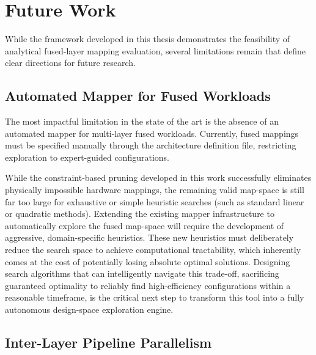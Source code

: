 \section{Future Work}
\label{sec:concl-future}

While the framework developed in this thesis demonstrates the feasibility of analytical fused-layer mapping evaluation, several limitations remain that define clear directions for future research.

\subsection{Automated Mapper for Fused Workloads}
\label{sec:fw-mapper}

The most impactful limitation in the state of the art is the absence of an automated mapper for multi-layer fused workloads. Currently, fused mappings must be specified manually through the architecture definition file, restricting exploration to expert-guided configurations. 

While the constraint-based pruning developed in this work successfully eliminates physically impossible hardware mappings, the remaining valid map-space is still far too large for exhaustive or simple heuristic searches (such as standard linear or quadratic methods). Extending the existing mapper infrastructure to automatically explore the fused map-space will require the development of aggressive, domain-specific heuristics. These new heuristics must deliberately reduce the search space to achieve computational tractability, which inherently comes at the cost of potentially losing absolute optimal solutions. Designing search algorithms that can intelligently navigate this trade-off, sacrificing guaranteed optimality to reliably find high-efficiency configurations within a reasonable timeframe, is the critical next step to transform this tool into a fully autonomous design-space exploration engine.
\subsection{Inter-Layer Pipeline Parallelism}
\label{sec:fw-inter-layer}


